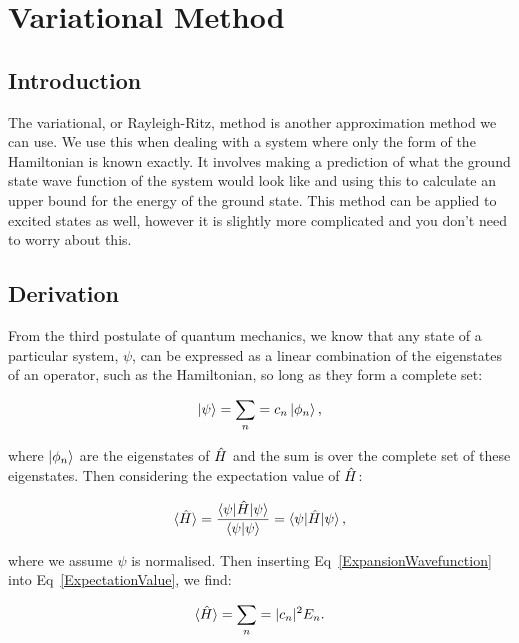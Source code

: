 \chapter{Variational Method}
\label{chapt3}

\section{Introduction}

The variational, or Rayleigh-Ritz, method is another approximation method we can use. We use this when dealing with a system where only the form of the Hamiltonian is known exactly. It involves making a prediction of what the ground state wave function of the system would look like and using this to calculate an upper bound for the energy of the ground state. This method can be applied to excited states as well, however it is slightly more complicated and you don't need to worry about this.

\section{Derivation}

From the third postulate of quantum mechanics, we know that any state of a particular system, $\psi$, can be expressed as a linear combination of the eigenstates of an operator, such as the Hamiltonian, so long as they form a complete set:

\begin{equation}
    \ket{\psi} = \sum_n = c_n \ket{\phi_n},
    \label{ExpansionWavefunction}
\end{equation}

\noindent where $\ket{\phi_n}$ are the eigenstates of $\Hat{H}$ and the sum is over the complete set of these eigenstates. Then considering the expectation value of $\Hat{H}$:

\begin{equation}
    \braket{\Hat{H}} = \frac{\braket{\psi | \Hat{H} | \psi}}{\braket{\psi | \psi}} = \braket{\psi | \Hat{H} | \psi},
    \label{ExpectationValue}
\end{equation}

\noindent where we assume $\psi$ is normalised. Then inserting Eq~\ref{ExpansionWavefunction} into Eq~\ref{ExpectationValue}, we find:

\begin{equation}
    \braket{\Hat{H}} = \sum_n = |c_n|^2 E_n.
    \label{ExpectationValueExpanded}
\end{equation}

